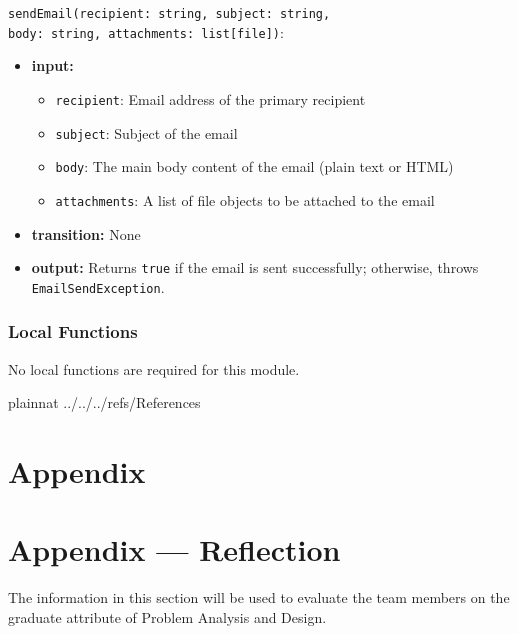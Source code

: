 \documentclass[12pt, titlepage]{article}
\begin{document}
\noindent \texttt{sendEmail(recipient: string, subject: string, \\
    body: string, attachments: list[file])}:
\begin{itemize}
    \item \textbf{input:} 
    \begin{itemize}
        \item \texttt{recipient}: Email address of the primary recipient
        \item \texttt{subject}: Subject of the email
        \item \texttt{body}: The main body content of the email (plain text or HTML)
        \item \texttt{attachments}: A list of file objects to be attached to the email
    \end{itemize}
    \item \textbf{transition:} None
    \item \textbf{output:} Returns \texttt{true} if the email is sent successfully; otherwise, throws \texttt{EmailSendException}.
\end{itemize}


\subsubsection{Local Functions}
No local functions are required for this module.

\newpage

 {plainnat}
 {../../../refs/References}

\newpage

\section{Appendix} \label{Appendix}

\newpage{}

\section*{Appendix --- Reflection}

The information in this section will be used to evaluate the team members on the
graduate attribute of Problem Analysis and Design.


\end{document}

